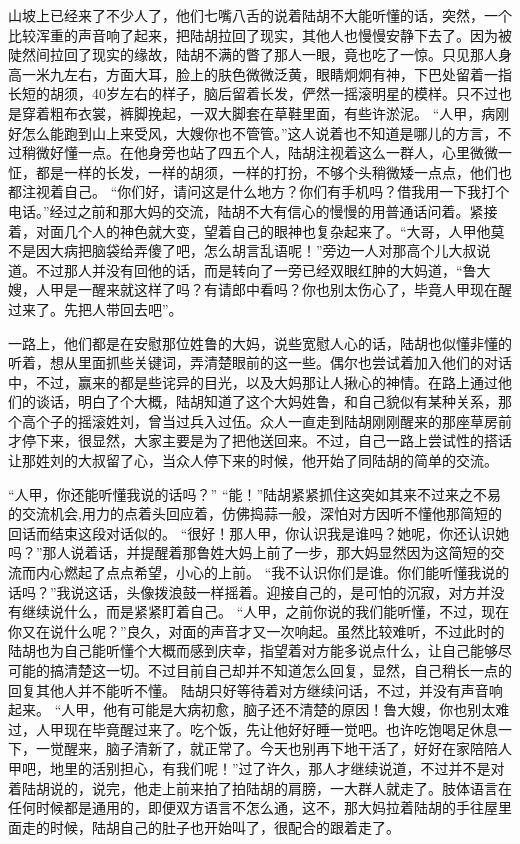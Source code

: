 \par{
山坡上已经来了不少人了，他们七嘴八舌的说着陆胡不大能听懂的话，突然，一个比较浑重的声音响了起来，把陆胡拉回了现实，其他人也慢慢安静下去了。因为被陡然间拉回了现实的缘故，陆胡不满的瞥了那人一眼，竟也吃了一惊。只见那人身高一米九左右，方面大耳，脸上的肤色微微泛黄，眼睛炯炯有神，下巴处留着一指长短的胡须，40岁左右的样子，脑后留着长发，俨然一摇滚明星的模样。只不过也是穿着粗布衣裳，裤脚挽起，一双大脚套在草鞋里面，有些许淤泥。\wx
“人甲，病刚好怎么能跑到山上来受风，大嫂你也不管管。”这人说着也不知道是哪儿的方言，不过稍微好懂一点。在他身旁也站了四五个人，陆胡注视着这么一群人，心里微微一怔，都是一样的长发，一样的胡须，一样的打扮，不够个头稍微矮一点点，他们也都注视着自己。\wx
“你们好，请问这是什么地方？你们有手机吗？借我用一下我打个电话。”经过之前和那大妈的交流，陆胡不大有信心的慢慢的用普通话问着。紧接着，对面几个人的神色就大变，望着自己的眼神也复杂起来了。“大哥，人甲他莫不是因大病把脑袋给弄傻了吧，怎么胡言乱语呢！”旁边一人对那高个儿大叔说道。不过那人并没有回他的话，而是转向了一旁已经双眼红肿的大妈道，“鲁大嫂，人甲是一醒来就这样了吗？有请郎中看吗？你也别太伤心了，毕竟人甲现在醒过来了。先把人带回去吧”。
}
\par{
一路上，他们都是在安慰那位姓鲁的大妈，说些宽慰人心的话，陆胡也似懂非懂的听着，想从里面抓些关键词，弄清楚眼前的这一些。偶尔也尝试着加入他们的对话中，不过，赢来的都是些诧异的目光，以及大妈那让人揪心的神情。在路上通过他们的谈话，明白了个大概，陆胡知道了这个大妈姓鲁，和自己貌似有某种关系，那个高个子的摇滚姓刘，曾当过兵入过伍。众人一直走到陆胡刚刚醒来的那座草房前才停下来，很显然，大家主要是为了把他送回来。不过，自己一路上尝试性的搭话让那姓刘的大叔留了心，当众人停下来的时候，他开始了同陆胡的简单的交流。}
\par{
 “人甲，你还能听懂我说的话吗？”\wx
 “能！”陆胡紧紧抓住这突如其来不过来之不易的交流机会,用力的点着头回应着，仿佛捣蒜一般，深怕对方因听不懂他那简短的回话而结束这段对话似的。\wx
 “很好！那人甲，你认识我是谁吗？她呢，你还认识她吗？”那人说着话，并提醒着那鲁姓大妈上前了一步，那大妈显然因为这简短的交流而内心燃起了点点希望，小心的上前。\wx
 “我不认识你们是谁。你们能听懂我说的话吗？”我说这话，头像拨浪鼓一样摇着。迎接自己的，是可怕的沉寂，对方并没有继续说什么，而是紧紧盯着自己。\wx
 “人甲，之前你说的我们能听懂，不过，现在你又在说什么呢？”良久，对面的声音才又一次响起。虽然比较难听，不过此时的陆胡也为自己能听懂个大概而感到庆幸，指望着对方能多说点什么，让自己能够尽可能的搞清楚这一切。不过目前自己却并不知道怎么回复，显然，自己稍长一点的回复其他人并不能听不懂。\wx
陆胡只好等待着对方继续问话，不过，并没有声音响起来。\wx
 “人甲，他有可能是大病初愈，脑子还不清楚的原因！鲁大嫂，你也别太难过，人甲现在毕竟醒过来了。吃个饭，先让他好好睡一觉吧。也许吃饱喝足休息一下，一觉醒来，脑子清新了，就正常了。今天也别再下地干活了，好好在家陪陪人甲吧，地里的活别担心，有我们呢！”过了许久，那人才继续说道，不过并不是对着陆胡说的，说完，他走上前来拍了拍陆胡的肩膀，一大群人就走了。肢体语言在任何时候都是通用的，即便双方语言不怎么通，这不，那大妈拉着陆胡的手往屋里面走的时候，陆胡自己的肚子也开始叫了，很配合的跟着走了。
}
